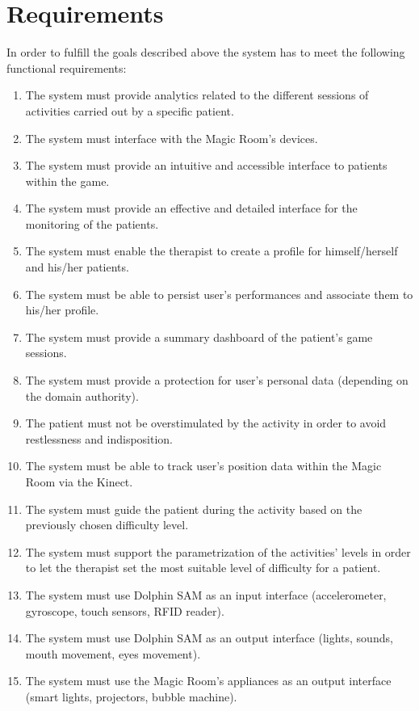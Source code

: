 \section{Requirements}
In order to fulfill the goals described above the system has to meet the following functional requirements:
\begin{enumerate}
	\item The system must provide analytics related to the different sessions of activities carried out by a specific patient.
	\item The system must interface with the Magic Room’s devices.
	\item The system must provide an intuitive and accessible interface to patients within the game.
	\item The system must provide an effective and detailed interface for the monitoring of the patients.
	\item The system must enable the therapist to create a profile for himself/herself and his/her patients.
	\item The system must be able to persist user’s performances and associate them to his/her profile.
	\item The system must provide a summary dashboard of the patient’s game sessions.
	\item The system must provide a protection for user’s personal data (depending on the domain authority).
	\item The patient must not be overstimulated by the activity in order to avoid restlessness and indisposition.
	\item The system must be able to track user’s position data within the Magic Room via the Kinect.
	\item The system must guide the patient during the activity based on the previously chosen difficulty level.
	\item The system must support the parametrization of the activities' levels in order to let the therapist set the most suitable level of difficulty for a patient.
	\item The system must use Dolphin SAM as an input interface (accelerometer, gyroscope, touch sensors, RFID reader).
	\item The system must use Dolphin SAM as an output interface (lights, sounds, mouth movement, eyes movement).
	\item The system must use the Magic Room's appliances as an output interface (smart lights, projectors, bubble machine).
\end{enumerate}
